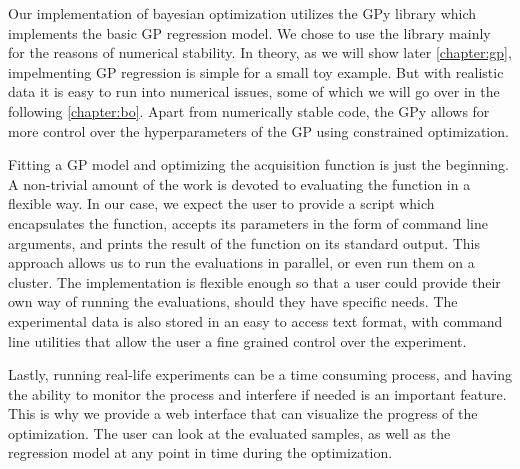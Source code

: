 Our implementation of bayesian optimization utilizes the GPy library \citep{gpy2014}
which implements the basic GP regression model. We chose to use the library
mainly for the reasons of numerical stability. In theory, as we will show later
\autoref{chapter:gp}, impelmenting GP regression is simple for a small toy example.
But with realistic data it is easy to run into numerical issues, some of which
we will go over in the following \autoref{chapter:bo}. Apart from
numerically stable code, the GPy allows for more control over the
hyperparameters of the GP using constrained optimization.

Fitting a GP model and optimizing the acquisition function is just the
beginning. A non-trivial amount of the work is devoted to evaluating the
function in a flexible way. In our case, we expect the user to provide a script
which encapsulates the function, accepts its parameters in the form of command
line arguments, and prints the result of the function on its standard output.
This approach allows us to run the evaluations in parallel, or even run them on
a cluster. The implementation is flexible enough so that a user could provide
their own way of running the evaluations, should they have specific needs.  The
experimental data is also stored in an easy to access text format, with command
line utilities that allow the user a fine grained control over the experiment.

Lastly, running real-life experiments can be a time consuming process, and
having the ability to monitor the process and interfere if needed is an
important feature. This is why we provide a web interface that can visualize
the progress of the optimization. The user can look at the evaluated samples,
as well as the regression model at any point in time during the optimization.



